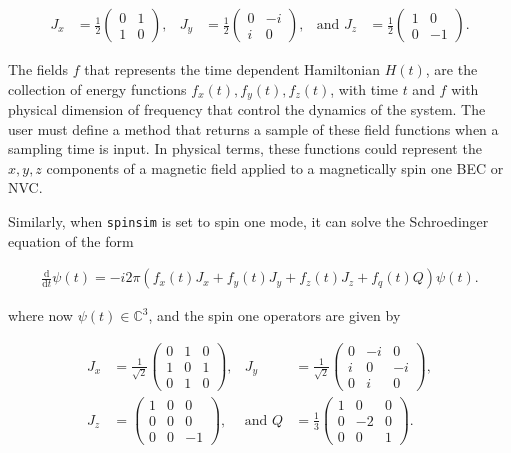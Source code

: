 \documentclass{jors}
\begin{document}
			\begin{align}
				J_x &= \frac12\begin{pmatrix}
					0 & 1 \\
					1 & 0
				\end{pmatrix},
				&J_y &= \frac12\begin{pmatrix}
					0 & -i \\
					i &  0
				\end{pmatrix},
				&\textrm{and }J_z &= \frac12\begin{pmatrix}
					1 &  0 \\
					0 & -1
				\end{pmatrix}.\label{eq:spin_half_operators}
			\end{align}

			The fields \(f\) that represents the time dependent Hamiltonian \(H(t)\), are the collection of energy functions \(f_x(t), f_y(t), f_z(t)\), with time \(t\) and \(f\) with physical dimension of frequency that control the dynamics of the system. The user must define a method that returns a sample of these field functions when a sampling time is input. In physical terms, these functions could represent the \(x,y,z\) components of a magnetic field applied to a magnetically spin one BEC or NVC.

			Similarly, when \texttt{spinsim} is set to spin one mode, it can solve the Schroedinger equation of the form

			\begin{align}
				\frac{\mathrm{d}}{\mathrm{d}t}\psi(t) = -i 2\pi (f_x(t) J_x + f_y(t) J_y + f_z(t) J_z + f_q(t) Q) \psi(t).
			\end{align}

			where now \(\psi(t) \in \mathbb{C}^3\), and the spin one operators are given by

			\begin{align}
				J_x &= \frac{1}{\sqrt{2}}\begin{pmatrix}
					0 & 1 & 0 \\
					1 & 0 & 1 \\
					0 & 1 & 0
				\end{pmatrix},&
				J_y &= \frac{1}{\sqrt{2}}\begin{pmatrix}
					0 & -i &  0 \\
					i &  0 & -i \\
					0 &  i &  0
				\end{pmatrix},\nonumber\\
				J_z &= \begin{pmatrix}
					1 & 0 &  0 \\
					0 & 0 &  0 \\
					0 & 0 & -1
				\end{pmatrix},&
				\textrm{and }Q &= \frac{1}{3}\begin{pmatrix}
					1 &  0 & 0 \\
					0 & -2 & 0 \\
					0 &  0 & 1
				\end{pmatrix}.\label{eq:spin_one_operators}
			\end{align}
\end{document}

